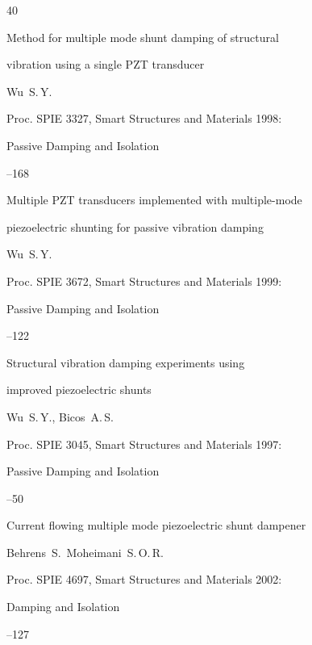 \begin{thebibliography}{40}

\paper Method for multiple mode shunt damping of structural

vibration using a single PZT transducer

\by Wu~S.\,Y.

\jour Proc. SPIE  3327, Smart Structures and Materials 1998:

Passive Damping and Isolation


--168





\paper Multiple PZT transducers implemented with multiple-mode

piezoelectric shunting for passive vibration damping

\by Wu~S.\,Y.

\jour Proc. SPIE  3672, Smart Structures and Materials 1999:

Passive Damping and Isolation


--122





\paper Structural vibration damping experiments using

improved piezoelectric shunts

\by Wu~S.\,Y., Bicos~A.\,S.

\jour Proc. SPIE  3045, Smart Structures and Materials 1997:

Passive Damping and Isolation


--50





\paper Current flowing multiple mode piezoelectric shunt dampener

\by Behrens~S.\, Moheimani~S.\,O.\,R.

\jour Proc. SPIE 4697, Smart Structures and Materials 2002:

Damping and Isolation


--127


\end{thebibliography}
